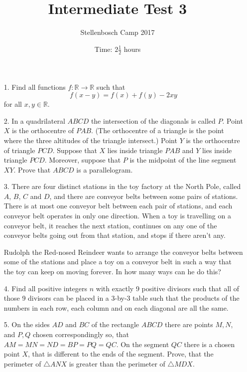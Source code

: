 \documentclass[12pt]{article}
\title{Intermediate Test 3}
\author{Stellenbosch Camp 2017}
\date{Time: $2\frac{1}{2}$ hours}
\begin{document}
 \maketitle

\begin{enumerate}

\item[1.]  
Find all functions $f:\mathbb{R} \rightarrow \mathbb{R}$ such that
    $$ f(x-y)=f(x)+f(y)-2xy $$
    for all $x, y \in \mathbb{R}$.


\item[2.] %
In a quadrilateral $ABCD$ the intersection of the diagonals is called $P$. Point $X$ is the orthocentre of $PAB$. (The orthocentre of a triangle is the point where the three altitudes of the triangle intersect.) Point $Y$ is the orthocentre of triangle $PCD$. Suppose that $X$ lies inside triangle $PAB$ and $Y$ lies inside triangle $PCD$. Moreover, suppose that $P$ is the midpoint of the line segment $XY$. Prove that $ABCD$ is a parallelogram.


\item[3.] %
There are four distinct stations in the toy factory at the North Pole, called $A$, $B$, $C$ and $D$, and there are conveyor belts between some pairs of stations. There is at most one conveyor belt between each pair of stations, and each conveyor belt operates in only one direction. When a toy is travelling on a conveyor belt, it reaches the next station, continues on any one of the conveyor belts going out from that station, and stops if there aren't any.

Rudolph the Red-nosed Reindeer wants to arrange the conveyor belts between some of the stations and place a toy on a conveyor belt in such a way that the toy can keep on moving forever. In how many ways can he do this?


\item[4.] %
Find all positive integers $n$ with exactly 9 positive divisors such that all of those 9 divisors can be placed in a 3-by-3 table such that the products of the numbers in each row, each column and on each diagonal are all the same.


\item[5.] %
On the sides $AD$ and $BC$ of the rectangle $ABCD$ there are points $M, N$, and $P, Q$ chosen correspondingly so, that $AM = MN = ND = BP = PQ = QC$. On the segment $QC$ there is a chosen point $X$, that is different to the ends of the segment. Prove, that the perimeter of $\triangle ANX$ is greater than the perimeter of $\triangle MDX$.
 


\end{enumerate}
\end{document}
